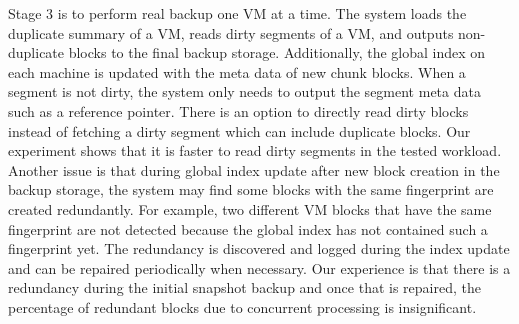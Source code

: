 Stage 3 is to perform real backup one VM at a time.
The system loads the duplicate summary of a VM, 
reads  dirty segments of a VM, and outputs non-duplicate blocks to the final backup 
storage. Additionally, the global index on each machine is updated with the meta data of new chunk blocks. 
When a segment is not dirty, the system only needs to output the segment meta data such as a reference pointer. 
There is an option to directly read dirty blocks instead of fetching a dirty segment which can include duplicate
blocks. Our experiment shows that it is faster to read dirty segments in the tested workload.
Another issue is that during global index update after new block creation in the backup storage,
the system  may find some  blocks with the same fingerprint are 
created redundantly. For example, two different VM blocks that have the same  fingerprint are not detected
because  the  global index has not contained such a fingerprint yet. 
The redundancy is discovered and logged during the index update and can be repaired
periodically when necessary.  Our experience is that there is a redundancy during the initial snapshot backup and once 
that is repaired, the percentage of redundant blocks due to concurrent processing  is insignificant.




